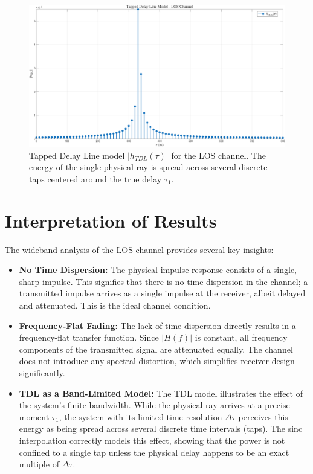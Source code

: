 \begin{figure}[h!]
	\centering
	\includegraphics[width=\linewidth]{"content/4-images/Tapped Delay Line Model - LOS Channel.png"}
	\caption{Tapped Delay Line model $|h_{TDL}(\tau)|$ for the LOS channel. The energy of the single physical ray is spread across several discrete taps centered around the true delay $\tau_1$.}
	\label{fig:h_tdl_los}
\end{figure}

\section{Interpretation of Results}
The wideband analysis of the LOS channel provides several key insights:
\begin{itemize}
	\item \textbf{No Time Dispersion:} The physical impulse response consists of a single, sharp impulse. This signifies that there is no time dispersion in the channel; a transmitted impulse arrives as a single impulse at the receiver, albeit delayed and attenuated. This is the ideal channel condition.
	\item \textbf{Frequency-Flat Fading:} The lack of time dispersion directly results in a frequency-flat transfer function. Since $|H(f)|$ is constant, all frequency components of the transmitted signal are attenuated equally. The channel does not introduce any spectral distortion, which simplifies receiver design significantly.
	\item \textbf{TDL as a Band-Limited Model:} The TDL model illustrates the effect of the system's finite bandwidth. While the physical ray arrives at a precise moment $\tau_1$, the system with its limited time resolution $\Delta\tau$ perceives this energy as being spread across several discrete time intervals (taps). The sinc interpolation correctly models this effect, showing that the power is not confined to a single tap unless the physical delay happens to be an exact multiple of $\Delta\tau$.
\end{itemize}
